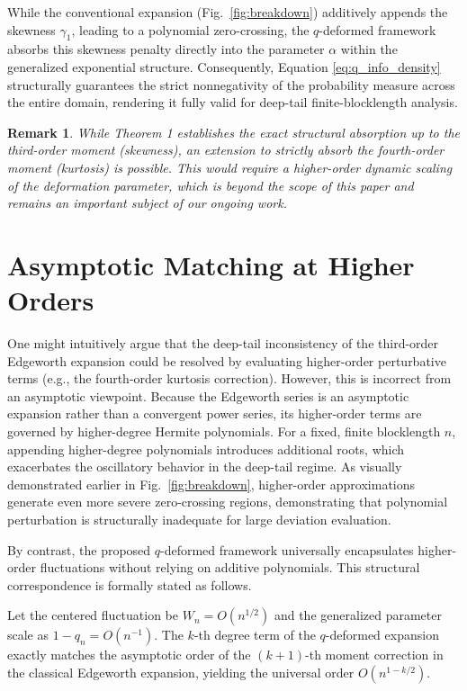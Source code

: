 \documentclass[conference]{IEEEtran}
\newtheorem{remark}{Remark}
\begin{document}
While the conventional expansion (Fig.~\ref{fig:breakdown}) additively appends the skewness $\gamma_1$, leading to a polynomial zero-crossing, the $q$-deformed framework absorbs this skewness penalty directly into the parameter $\alpha$ within the generalized exponential structure. Consequently, Equation \eqref{eq:q_info_density} structurally guarantees the strict nonnegativity of the probability measure across the entire domain, rendering it fully valid for deep-tail finite-blocklength analysis.

\begin{remark}
While Theorem 1 establishes the exact structural absorption up to the third-order moment (skewness), an extension to strictly absorb the fourth-order moment (kurtosis) is possible. This would require a higher-order dynamic scaling of the deformation parameter, which is beyond the scope of this paper and remains an important subject of our ongoing work.
\end{remark}

\section{Asymptotic Matching at Higher Orders}
\label{sec:higher_order}

One might intuitively argue that the deep-tail inconsistency of the third-order Edgeworth expansion could be resolved by evaluating higher-order perturbative terms (e.g., the fourth-order kurtosis correction). However, this is incorrect from an asymptotic viewpoint.
Because the Edgeworth series is an asymptotic expansion rather than a convergent power series, its higher-order terms are governed by higher-degree Hermite polynomials. For a fixed, finite blocklength $n$, appending higher-degree polynomials introduces additional roots, which exacerbates the oscillatory behavior in the deep-tail regime. As visually demonstrated earlier in Fig.~\ref{fig:breakdown}, higher-order approximations generate even more severe zero-crossing regions, demonstrating that polynomial perturbation is structurally inadequate for large deviation evaluation.

By contrast, the proposed $q$-deformed framework universally encapsulates higher-order fluctuations without relying on additive polynomials. This structural correspondence is formally stated as follows.

\begin{theorem}
\label{thm:resonance}
Let the centered fluctuation be $W_n = O(n^{1/2})$ and the generalized parameter scale as $1-q_n = O(n^{-1})$. The $k$-th degree term of the $q$-deformed expansion exactly matches the asymptotic order of the $(k+1)$-th moment correction in the classical Edgeworth expansion, yielding the universal order $O(n^{1-k/2})$.
\end{theorem}
\end{document}
